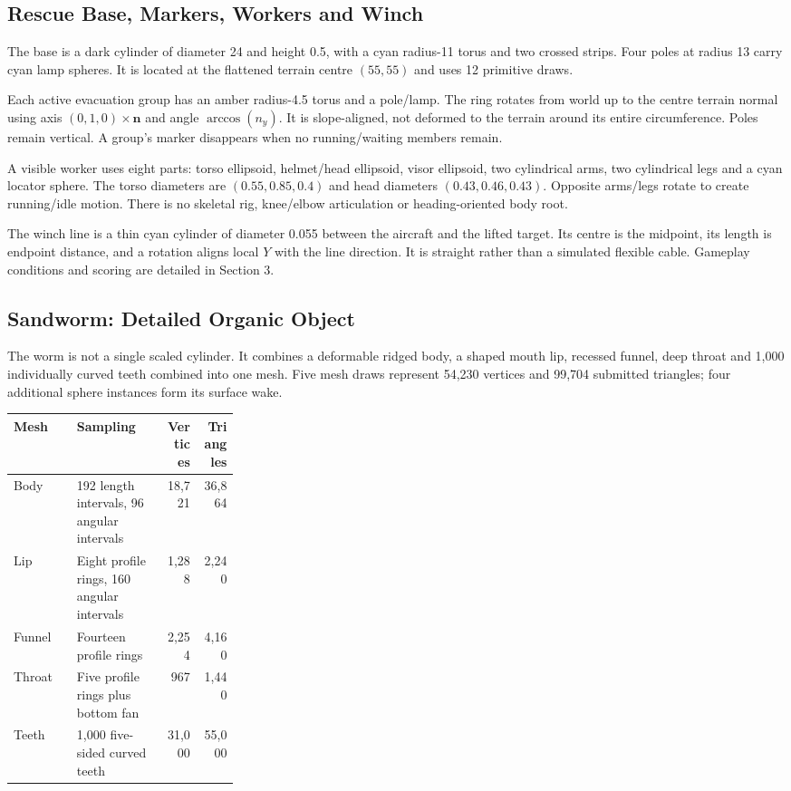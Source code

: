 \subsection{Rescue Base, Markers, Workers and Winch}
The base is a dark cylinder of diameter 24 and height 0.5, with a cyan radius-11 torus and two crossed strips. Four poles at radius 13 carry cyan lamp spheres. It is located at the flattened terrain centre $(55,55)$ and uses 12 primitive draws.

Each active evacuation group has an amber radius-4.5 torus and a pole/lamp. The ring rotates from world up to the centre terrain normal using axis $(0,1,0)\times\mathbf n$ and angle $\arccos(n_y)$. It is slope-aligned, not deformed to the terrain around its entire circumference. Poles remain vertical. A group's marker disappears when no running/waiting members remain.

A visible worker uses eight parts: torso ellipsoid, helmet/head ellipsoid, visor ellipsoid, two cylindrical arms, two cylindrical legs and a cyan locator sphere. The torso diameters are $(0.55,0.85,0.4)$ and head diameters $(0.43,0.46,0.43)$. Opposite arms/legs rotate to create running/idle motion. There is no skeletal rig, knee/elbow articulation or heading-oriented body root.

The winch line is a thin cyan cylinder of diameter 0.055 between the aircraft and the lifted target. Its centre is the midpoint, its length is endpoint distance, and a rotation aligns local $Y$ with the line direction. It is straight rather than a simulated flexible cable. Gameplay conditions and scoring are detailed in Section 3.

\subsection{Sandworm: Detailed Organic Object}
The worm is not a single scaled cylinder. It combines a deformable ridged body, a shaped mouth lip, recessed funnel, deep throat and 1,000 individually curved teeth combined into one mesh. Five mesh draws represent 54,230 vertices and 99,704 submitted triangles; four additional sphere instances form its surface wake.

\begin{tabularx}{\linewidth}{L{0.29\linewidth}Y r r}
\toprule\textbf{Mesh}&\textbf{Sampling}&\textbf{Vertices}&\textbf{Triangles}\\\midrule
Body & 192 length intervals, 96 angular intervals & 18,721 & 36,864\\
Lip & Eight profile rings, 160 angular intervals & 1,288 & 2,240\\
Funnel & Fourteen profile rings & 2,254 & 4,160\\
Throat & Five profile rings plus bottom fan & 967 & 1,440\\
Teeth & 1,000 five-sided curved teeth & 31,000 & 55,000\\
\bottomrule
\end{tabularx}

